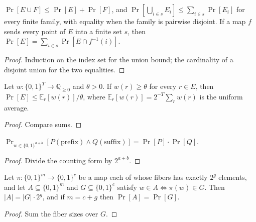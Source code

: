 \begin{lemma}
  \label{lem:encodings-union-bound}
  \leanok
  $\Pr[E \cup F] \le \Pr[E] + \Pr[F]$, and
  $\Pr[\bigcup_{i \in s} E_i] \le \sum_{i \in s} \Pr[E_i]$ for every finite
  family, with equality when the family is pairwise disjoint. If a map $f$
  sends every point of $E$ into a finite set $s$, then
  $\Pr[E] = \sum_{i \in s} \Pr[E \cap f^{-1}(i)]$.
\end{lemma}
\begin{proof}
  \leanok
  Induction on the index set for the union bound; the cardinality of a
  disjoint union for the two equalities.
\end{proof}

\begin{lemma}
  \label{lem:encodings-markov}
  \leanok
  Let $w : \{0,1\}^T \to \mathbb{Q}_{\ge 0}$ and $\theta > 0$. If
  $w(r) \ge \theta$ for every $r \in E$, then
  $\Pr[E] \le \mathbb{E}_r[w(r)] / \theta$, where
  $\mathbb{E}_r[w(r)] = 2^{-T} \sum_r w(r)$ is the uniform average.
\end{lemma}
\begin{proof}
  \leanok
  Compare sums.
\end{proof}

\begin{lemma}
  \label{lem:encodings-eventprob-block}
  \leanok
  $\Pr_{w \in \{0,1\}^{a+b}}[P(\text{prefix}) \wedge Q(\text{suffix})] =
  \Pr[P] \cdot \Pr[Q]$.
\end{lemma}
\begin{proof}
  \leanok
  Divide the counting form by $2^{a+b}$.
\end{proof}

\begin{lemma}
  \label{lem:encodings-constant-fibers}
  \leanok
  Let $\pi : \{0,1\}^m \to \{0,1\}^c$ be a map each of whose fibers has
  exactly $2^g$ elements, and let $A \subseteq \{0,1\}^m$ and
  $G \subseteq \{0,1\}^c$ satisfy $w \in A \iff \pi(w) \in G$. Then
  $|A| = |G| \cdot 2^g$, and if $m = c + g$ then $\Pr[A] = \Pr[G]$.
\end{lemma}
\begin{proof}
  \leanok
  Sum the fiber sizes over $G$.
\end{proof}

